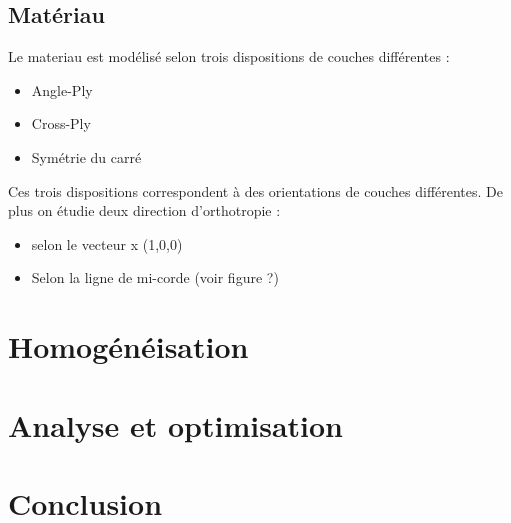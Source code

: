 \documentclass[12pt,a4paper]{article}
\begin{document}
\subsection{Matériau}
Le materiau est modélisé selon trois dispositions de couches différentes :
\begin{itemize}
\item Angle-Ply
\item Cross-Ply
\item Symétrie du carré
\end{itemize}
Ces trois dispositions correspondent à des orientations de couches différentes. De plus on étudie deux direction d'orthotropie : 
\begin{itemize}
\item selon le vecteur x (1,0,0)
\item Selon la ligne de mi-corde (voir figure ?)
\end{itemize}
\section{Homogénéisation}
\section{Analyse et optimisation}
\section{Conclusion}
\end{document}
